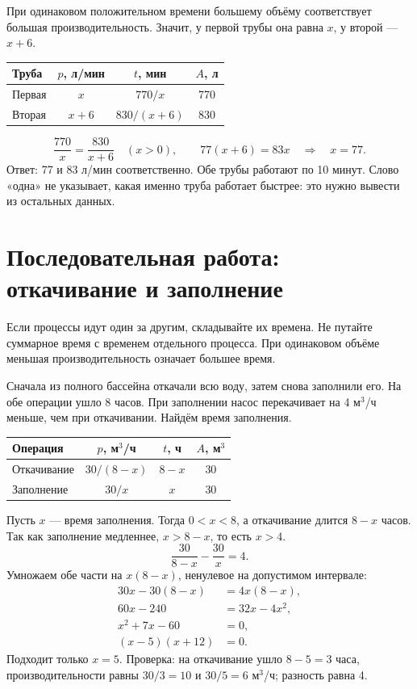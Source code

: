 \documentclass[a4paper,12pt]{article}
\newcommand{\example}[1]{\par\medskip{\color{darkaccent}\textbf{#1}}\par\smallskip}
\begin{document}
При одинаковом положительном времени большему объёму соответствует большая производительность. Значит, у первой трубы она равна $x$, у второй --- $x+6$.
\begin{center}
\begin{tabularx}{\linewidth}{@{}Xccc@{}}
\toprule
Труба & $p$, л/мин & $t$, мин & $A$, л\\\midrule
Первая & $x$ & $770/x$ & 770\\
Вторая & $x+6$ & $830/(x+6)$ & 830\\\bottomrule
\end{tabularx}
\end{center}
\[
 \frac{770}{x}=\frac{830}{x+6}\quad(x>0),\qquad
 77(x+6)=83x\quad\Longrightarrow\quad x=77.
\]
Ответ: 77 и 83 л/мин соответственно. Обе трубы работают по 10 минут. Слово «одна» не указывает, какая именно труба работает быстрее: это нужно вывести из остальных данных.
\clearpage
\section{Последовательная работа: откачивание и заполнение}
Если процессы идут один за другим, складывайте их времена. Не путайте суммарное время с временем отдельного процесса. При одинаковом объёме меньшая производительность означает большее время.
\example{Пример 7. Бассейн объёмом 30 м$^3$}
Сначала из полного бассейна откачали всю воду, затем снова заполнили его. На обе операции ушло 8 часов. При заполнении насос перекачивает на 4 м$^3$/ч меньше, чем при откачивании. Найдём время заполнения.
\begin{center}
\begin{tabularx}{\linewidth}{@{}Xccc@{}}
\toprule
Операция & $p$, м$^3$/ч & $t$, ч & $A$, м$^3$\\\midrule
Откачивание & $30/(8-x)$ & $8-x$ & 30\\
Заполнение & $30/x$ & $x$ & 30\\\bottomrule
\end{tabularx}
\end{center}
Пусть $x$ --- время заполнения. Тогда $0<x<8$, а откачивание длится $8-x$ часов. Так как заполнение медленнее, $x>8-x$, то есть $x>4$.
\[
 \frac{30}{8-x}-\frac{30}{x}=4.
\]
Умножаем обе части на $x(8-x)$, ненулевое на допустимом интервале:
\begin{align*}
 30x-30(8-x)&=4x(8-x),\\
 60x-240&=32x-4x^2,\\
 x^2+7x-60&=0,\\
 (x-5)(x+12)&=0.
\end{align*}
Подходит только $x=5$. Проверка: на откачивание ушло $8-5=3$ часа, производительности равны $30/3=10$ и $30/5=6$ м$^3$/ч; разность равна 4.
\end{document}
